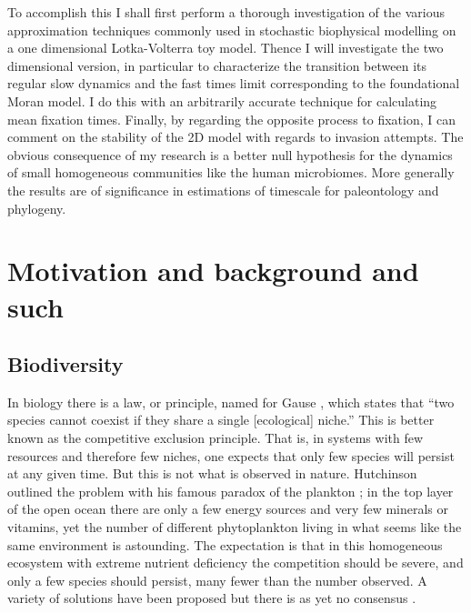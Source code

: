 To accomplish this I shall first perform a thorough investigation of the various approximation techniques commonly used in stochastic biophysical modelling on a one dimensional Lotka-Volterra toy model. 
Thence I will investigate the two dimensional version, in particular to characterize the transition between its regular slow dynamics and the fast times limit corresponding to the foundational Moran model. 
I do this with an arbitrarily accurate technique for calculating mean fixation times. 
Finally, by regarding the opposite process to fixation, I can comment on the stability of the 2D model with regards to invasion attempts. 
The obvious consequence of my research is a better null hypothesis for the dynamics of small homogeneous communities like the human microbiomes. 
More generally the results are of significance in estimations of timescale for paleontology and phylogeny. 



\section{Motivation and background and such}
\subsection{Biodiversity}
In biology there is a law, or principle, named for Gause \cite{Gause1934}, which states that ``two species cannot coexist if they share a single [ecological] niche.'' 
This is better known as the competitive exclusion principle. %
That is, in systems with few resources and therefore few niches, one expects that only few species will persist at any given time. 
But this is not what is observed in nature. 
Hutchinson outlined the problem with his famous paradox of the plankton \cite{Hutchinson1961}; %
in the top layer of the open ocean there are only a few energy sources and very few minerals or vitamins, yet the number of different phytoplankton living in what seems like the same environment is astounding. 
The expectation is that in this homogeneous ecosystem with extreme nutrient deficiency the competition should be severe, and only a few species should persist, many fewer than the number observed. 
A variety of solutions have been proposed but there is as yet no consensus \cite{Roy2007}. 

